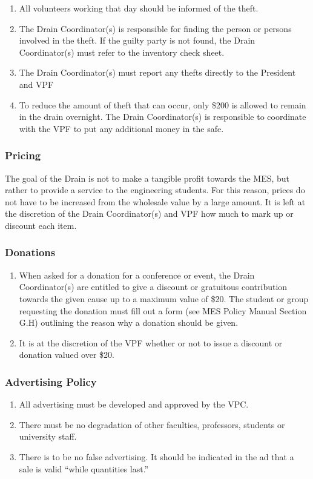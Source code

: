 \begin{enumerate}
 \item
  All volunteers working that day should be informed of the theft.
 \item
  The Drain Coordinator(s) is responsible for finding the person or persons involved in the theft. If the guilty party is not found, the Drain Coordinator(s) must refer to the inventory check sheet.
 \item
  The Drain Coordinator(s) must report any thefts directly to the President and VPF
 \item
  To reduce the amount of theft that can occur, only \$200 is allowed to remain in the drain overnight. The Drain Coordinator(s) is responsible to coordinate with the VPF to put any additional money in the safe.
\end{enumerate}

\subsubsection{Pricing}
\label{pricing}
The goal of the Drain is not to make a tangible profit towards the MES,
but rather to provide a service to the engineering students. For this
reason, prices do not have to be increased from the wholesale value by a
large amount. It is left at the discretion of the Drain Coordinator(s)
and VPF how much to mark up or discount each item.

\subsubsection{Donations}
\label{drain-donations}

\begin{enumerate}
 \item
  When asked for a donation for a conference or event, the Drain Coordinator(s) are entitled to give a discount or gratuitous contribution towards the given cause up to a maximum value of \$20. The student or group requesting the donation must fill out a form (see MES Policy Manual Section G.H) outlining the reason why a donation should be given. %
 \item
  It is at the discretion of the VPF whether or not to issue a discount or donation valued over \$20.

\end{enumerate}

\subsubsection{Advertising Policy}
\label{advertising-policy}
\begin{enumerate}
 \item
  All advertising must be developed and approved by the VPC.
 \item
  There must be no degradation of other faculties, professors, students or university staff.
 \item
  There is to be no false advertising. It should be indicated in the ad that a sale is valid ``while quantities last.''

\end{enumerate}

